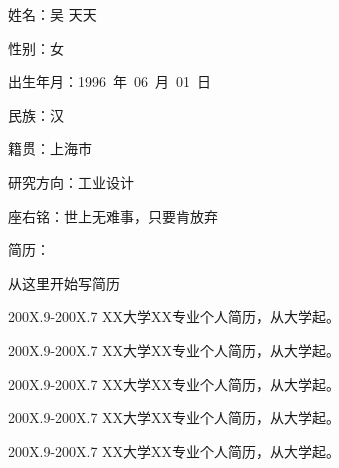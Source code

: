 
%
%
%


\begin{window}
\end{window}

姓名：吴 天天

性别：女

出生年月：1996~年~06~月~01~日

民族：汉

籍贯：上海市

研究方向：工业设计

座右铭：世上无难事，只要肯放弃

\vspace*{5em}

简历：

从这里开始写简历

200X.9-200X.7  XX大学XX专业个人简历，从大学起。

200X.9-200X.7  XX大学XX专业个人简历，从大学起。

200X.9-200X.7  XX大学XX专业个人简历，从大学起。

200X.9-200X.7  XX大学XX专业个人简历，从大学起。

200X.9-200X.7  XX大学XX专业个人简历，从大学起。
